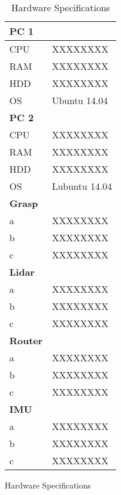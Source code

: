 \begin{figure}[htbp]
	\begin{minipage}{0.45\textwidth}
		\caption{KUKA youBot Plattform}
		\label{fig:youBot}
	\end{minipage}
	\hfill
	\begin{minipage}{0.45\textwidth}
		\begin{table}[htbp]
			\label{tab:hw}
			\caption{Hardware Specifications}
			\centering
			\begin{tabular}{ | p{2cm} | p{3cm} | }
				\hline
				\bfseries{PC 1} &  \\
				\hline
				CPU & XXXXXXXX \\
				RAM & XXXXXXXX \\
				HDD & XXXXXXXX \\
				OS & Ubuntu 14.04 \\
				\hline \hline
				\bfseries{PC 2} &  \\
				\hline
				CPU & XXXXXXXX \\
				RAM & XXXXXXXX \\
				HDD & XXXXXXXX \\
				OS & Lubuntu 14.04 \\
				\hline \hline
				\bfseries{Grasp} &  \\
				\hline
				a & XXXXXXXX \\
				b & XXXXXXXX \\
				c & XXXXXXXX \\
				\hline \hline
				\bfseries{Lidar} &  \\
				\hline
				a & XXXXXXXX \\
				b & XXXXXXXX \\
				c & XXXXXXXX \\
				\hline \hline
				\bfseries{Router} &  \\
				\hline
				a & XXXXXXXX \\
				b & XXXXXXXX \\
				c & XXXXXXXX \\
				\hline \hline
				\bfseries{IMU} &  \\
				\hline
				a & XXXXXXXX \\
				b & XXXXXXXX \\
				c & XXXXXXXX \\
				\hline
			\end{tabular}
			\label{tab:hw}
		\end{table}
	\end{minipage}
\end{figure}

